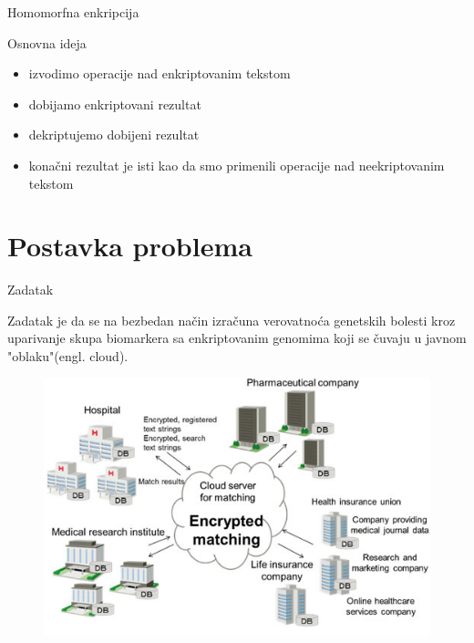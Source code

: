 \documentclass[10pt]{beamer}
\begin{document}
\begin{frame}{Homomorfna enkripcija}
\begin{block}{Osnovna ideja}
	\begin{itemize}
		\item izvodimo operacije nad enkriptovanim tekstom
		\item dobijamo enkriptovani rezultat
		\item dekriptujemo dobijeni rezultat
		\item konačni rezultat je isti kao da smo primenili operacije nad neekriptovanim tekstom
	\end{itemize}
\end{block}
\end{frame}

\section{Postavka problema}
\begin{frame}{Zadatak}
\begin{block}{}
	Zadatak je da se na bezbedan način izračuna verovatnoća genetskih
bolesti kroz uparivanje skupa biomarkera sa enkriptovanim genomima koji
se čuvaju u javnom "oblaku"(engl. cloud).
\end{block}
\end{frame}

\begin{frame}
\begin{figure}[H]
 	\centering
	\includegraphics[width=\textwidth,height=\textheight,keepaspectratio]{slika2.jpg}
 	\label{fig:primer}
 \end{figure}
\end{frame}
\end{document}
